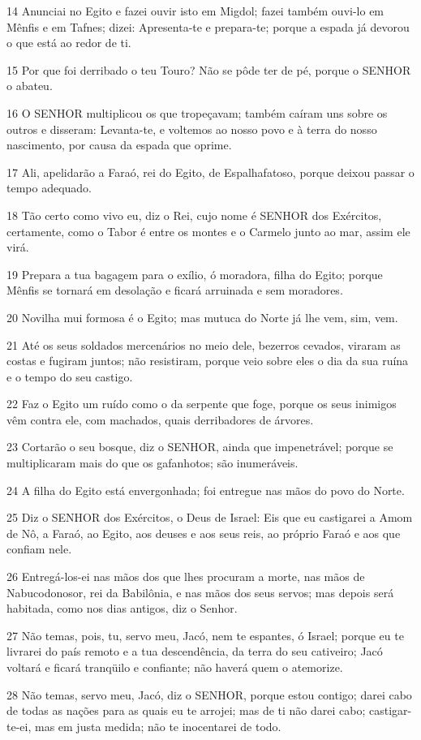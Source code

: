 \par 14 Anunciai no Egito e fazei ouvir isto em Migdol; fazei também ouvi-lo em Mênfis e em Tafnes; dizei: Apresenta-te e prepara-te; porque a espada já devorou o que está ao redor de ti.
\par 15 Por que foi derribado o teu Touro? Não se pôde ter de pé, porque o SENHOR o abateu.
\par 16 O SENHOR multiplicou os que tropeçavam; também caíram uns sobre os outros e disseram: Levanta-te, e voltemos ao nosso povo e à terra do nosso nascimento, por causa da espada que oprime.
\par 17 Ali, apelidarão a Faraó, rei do Egito, de Espalhafatoso, porque deixou passar o tempo adequado.
\par 18 Tão certo como vivo eu, diz o Rei, cujo nome é SENHOR dos Exércitos, certamente, como o Tabor é entre os montes e o Carmelo junto ao mar, assim ele virá.
\par 19 Prepara a tua bagagem para o exílio, ó moradora, filha do Egito; porque Mênfis se tornará em desolação e ficará arruinada e sem moradores.
\par 20 Novilha mui formosa é o Egito; mas mutuca do Norte já lhe vem, sim, vem.
\par 21 Até os seus soldados mercenários no meio dele, bezerros cevados, viraram as costas e fugiram juntos; não resistiram, porque veio sobre eles o dia da sua ruína e o tempo do seu castigo.
\par 22 Faz o Egito um ruído como o da serpente que foge, porque os seus inimigos vêm contra ele, com machados, quais derribadores de árvores.
\par 23 Cortarão o seu bosque, diz o SENHOR, ainda que impenetrável; porque se multiplicaram mais do que os gafanhotos; são inumeráveis.
\par 24 A filha do Egito está envergonhada; foi entregue nas mãos do povo do Norte.
\par 25 Diz o SENHOR dos Exércitos, o Deus de Israel: Eis que eu castigarei a Amom de Nô, a Faraó, ao Egito, aos deuses e aos seus reis, ao próprio Faraó e aos que confiam nele.
\par 26 Entregá-los-ei nas mãos dos que lhes procuram a morte, nas mãos de Nabucodonosor, rei da Babilônia, e nas mãos dos seus servos; mas depois será habitada, como nos dias antigos, diz o Senhor.
\par 27 Não temas, pois, tu, servo meu, Jacó, nem te espantes, ó Israel; porque eu te livrarei do país remoto e a tua descendência, da terra do seu cativeiro; Jacó voltará e ficará tranqüilo e confiante; não haverá quem o atemorize.
\par 28 Não temas, servo meu, Jacó, diz o SENHOR, porque estou contigo; darei cabo de todas as nações para as quais eu te arrojei; mas de ti não darei cabo; castigar-te-ei, mas em justa medida; não te inocentarei de todo.

